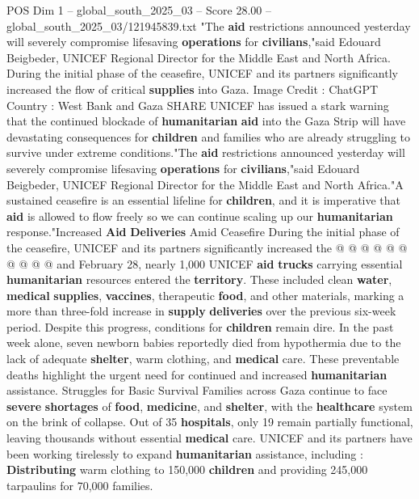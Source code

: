 \begin{textsample}{POS Dim 1 – global\_south\_2025\_03 – Score 28.00 – global\_south\_2025\_03/121945839.txt}  \label{ex:f1_pos_264}
"The \textbf{aid} restrictions announced yesterday will severely compromise lifesaving \textbf{operations} for \textbf{civilians},"said Edouard Beigbeder, UNICEF Regional Director for the Middle East and North Africa.
During the initial phase of the ceasefire, UNICEF and its partners significantly increased the flow of critical \textbf{supplies} into Gaza.
Image Credit : ChatGPT Country : West Bank and Gaza SHARE UNICEF has issued a stark warning that the continued blockade of \textbf{humanitarian} \textbf{aid} into the Gaza Strip will have devastating consequences for \textbf{children} and families who are already struggling to survive under extreme conditions."The \textbf{aid} restrictions announced yesterday will severely compromise lifesaving \textbf{operations} for \textbf{civilians},"said Edouard Beigbeder, UNICEF Regional Director for the Middle East and North Africa."A sustained ceasefire is an essential lifeline for \textbf{children}, and it is imperative that \textbf{aid} is allowed to flow freely so we can continue scaling up our \textbf{humanitarian} response."Increased \textbf{Aid} \textbf{Deliveries} Amid Ceasefire During the initial phase of the ceasefire, UNICEF and its partners significantly increased the @ @ @ @ @ @ @ @ @ @ and February 28, nearly 1,000 UNICEF \textbf{aid} \textbf{trucks} carrying essential \textbf{humanitarian} resources entered the \textbf{territory}.
These included clean \textbf{water}, \textbf{medical} \textbf{supplies}, \textbf{vaccines}, therapeutic \textbf{food}, and other materials, marking a more than three-fold increase in \textbf{supply} \textbf{deliveries} over the previous six-week period.
Despite this progress, conditions for \textbf{children} remain dire.
In the past week alone, seven newborn babies reportedly died from hypothermia due to the lack of adequate \textbf{shelter}, warm clothing, and \textbf{medical} care.
These preventable deaths highlight the urgent need for continued and increased \textbf{humanitarian} assistance.
Struggles for Basic Survival Families across Gaza continue to face \textbf{severe} \textbf{shortages} of \textbf{food}, \textbf{medicine}, and \textbf{shelter}, with the \textbf{healthcare} system on the brink of collapse.
Out of 35 \textbf{hospitals}, only 19 remain partially functional, leaving thousands without essential \textbf{medical} care.
UNICEF and its partners have been working tirelessly to expand \textbf{humanitarian} assistance, including : \textbf{Distributing} warm clothing to 150,000 \textbf{children} and providing 245,000 tarpaulins for 70,000 families.

\end{textsample}
